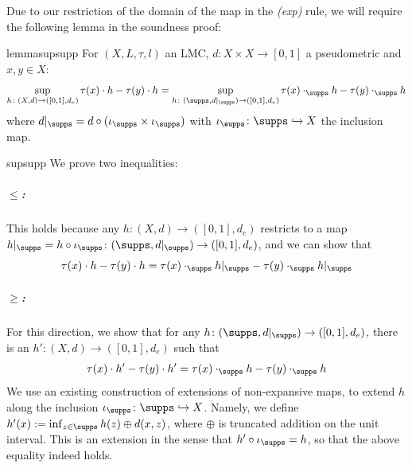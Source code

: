 Due to our restriction of the domain of the map in the \emph{(exp)} rule, we will require the following lemma in the soundness proof:
\begin{restatable}{lemma}{supsupp}\label{lem:supsupp}
	For \((X,L,\tau,l)\) an LMC, \(d \colon X \times X \to [0,1]\) a pseudometric and \(x,y \in X\):
	\[
		\sup_{h \colon (X,d) \to ([0,1],d_e)} \tau(x) \cdot h - \tau(y) \cdot h = \sup_{h \colon (\supps,d|_\supps) \to ([0,1],d_e)} \tau(x) \cdot_\supps h - \tau(y) \cdot_\supps h
	\]
	where \(d|_\supps = d \circ (\iota_\supps \times \iota_\supps)\) with \(\iota_\supps \colon \supps \hookrightarrow X\) the inclusion map.
\end{restatable}
\begin{proofappendix}{supsupp}
	We prove two inequalities:
	\subparagraph*{\(\leq\):}
	This holds because any \(h \colon (X,d) \to ([0,1],d_e)\) restricts to a map \(h|_\supps = h \circ \iota_\supps \colon (\supps,d|_\supps) \to ([0,1],d_e)\), and we can show that
	\[
		\tau(x) \cdot h - \tau(y) \cdot h = \tau(x) \cdot_\supps h|_\supps - \tau(y) \cdot_\supps h|_\supps
	\]
	\subparagraph*{\(\geq\):}
	For this direction, we show that for any \(h \colon (\supps, d|_\supps) \to ([0,1],d_e)\), there is an \(h' \colon (X,d) \to ([0,1],d_e)\) such that
	\[
		\tau(x) \cdot h' - \tau(y) \cdot h' = \tau(x) \cdot_\supps h - \tau(y) \cdot_\supps h
	\]
	We use an existing construction of extensions of non-expansive maps, to extend \(h\) along the inclusion \(\iota_\supps \colon \supps \hookrightarrow X\). Namely, we define \(h'(x) := \inf_{z \in \supps} h(z) \oplus d(x,z)\), where \(\oplus\) is truncated addition on the unit interval.
	This is an extension in the sense that \(h' \circ \iota_\supps = h\), so that the above equality indeed holds.
\end{proofappendix}

